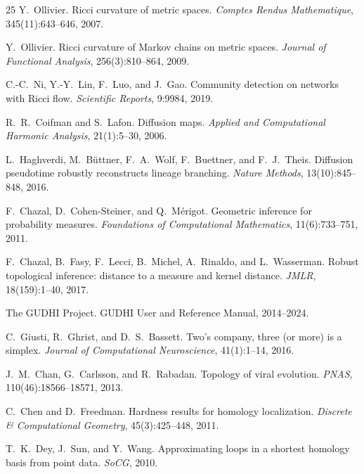 \documentclass[11pt]{article}
\begin{document}
\begin{thebibliography}{25}
Y.~Ollivier.
Ricci curvature of metric spaces.
\emph{Comptes Rendus Mathematique}, 345(11):643--646, 2007.

Y.~Ollivier.
Ricci curvature of Markov chains on metric spaces.
\emph{Journal of Functional Analysis}, 256(3):810--864, 2009.

C.-C.~Ni, Y.-Y.~Lin, F.~Luo, and J.~Gao.
Community detection on networks with Ricci flow.
\emph{Scientific Reports}, 9:9984, 2019.

R.~R.~Coifman and S.~Lafon.
Diffusion maps.
\emph{Applied and Computational Harmonic Analysis}, 21(1):5--30, 2006.

L.~Haghverdi, M.~B\"uttner, F.~A.~Wolf, F.~Buettner, and F.~J.~Theis.
Diffusion pseudotime robustly reconstructs lineage branching.
\emph{Nature Methods}, 13(10):845--848, 2016.

F.~Chazal, D.~Cohen-Steiner, and Q.~M\'erigot.
Geometric inference for probability measures.
\emph{Foundations of Computational Mathematics}, 11(6):733--751, 2011.

F.~Chazal, B.~Fasy, F.~Lecci, B.~Michel, A.~Rinaldo, and L.~Wasserman.
Robust topological inference: distance to a measure and kernel distance.
\emph{JMLR}, 18(159):1--40, 2017.

The GUDHI Project.
GUDHI User and Reference Manual, 2014--2024.

C.~Giusti, R.~Ghrist, and D.~S.~Bassett.
Two's company, three (or more) is a simplex.
\emph{Journal of Computational Neuroscience}, 41(1):1--14, 2016.

J.~M.~Chan, G.~Carlsson, and R.~Rabadan.
Topology of viral evolution.
\emph{PNAS}, 110(46):18566--18571, 2013.

C.~Chen and D.~Freedman.
Hardness results for homology localization.
\emph{Discrete \& Computational Geometry}, 45(3):425--448, 2011.

T.~K.~Dey, J.~Sun, and Y.~Wang.
Approximating loops in a shortest homology basis from point data.
\emph{SoCG}, 2010.

\end{thebibliography}
\end{document}
